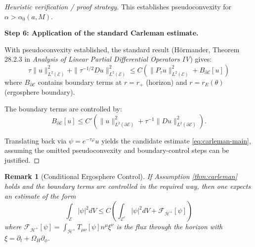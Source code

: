 \documentclass[12pt,a4paper]{article}
\newtheorem{remark}[theorem]{Remark}
\begin{document}
\begin{proof}[Heuristic verification / proof strategy]
This establishes pseudoconvexity for $\alpha > \alpha_0(a, M)$.

\textbf{Step 6: Application of the standard Carleman estimate.}

With pseudoconvexity established, the standard result (Hörmander, Theorem 28.2.3 in \textit{Analysis of Linear Partial Differential Operators IV}) gives:
\begin{equation}
\tau\|u\|_{L^2(\mathcal{E})}^2 + \|\tau^{-1/2}Du\|_{L^2(\mathcal{E})}^2 \leq C\left(\|P_\tau u\|_{L^2(\mathcal{E})}^2 + B_{\partial\mathcal{E}}[u]\right)
\end{equation}
where $B_{\partial\mathcal{E}}$ contains boundary terms at $r = r_+$ (horizon) and $r = r_E(\theta)$ (ergosphere boundary).

The boundary terms are controlled by:
\begin{equation}
B_{\partial\mathcal{E}}[u] \leq C'\left(\|u\|_{L^2(\partial\mathcal{E})}^2 + \tau^{-1}\|Du\|_{L^2(\partial\mathcal{E})}^2\right).
\end{equation}

Translating back via $\psi = e^{-\tau\varphi}u$ yields the candidate estimate \eqref{eq:carleman-main}, assuming the omitted pseudoconvexity and boundary-control steps can be justified.
\end{proof}

\begin{remark}[Conditional Ergosphere Control]\label{cor:ergo-control}
If Assumption \ref{thm:carleman} holds and the boundary terms are controlled in the required way, then one expects an estimate of the form
\begin{equation}
\int_{\mathcal{E}}|\psi|^2 dV \leq C\left(\int_{\mathcal{E}^c}|\psi|^2 dV + \mathcal{F}_{\mathcal{H}^+}[\psi]\right)
\end{equation}
where $\mathcal{F}_{\mathcal{H}^+}[\psi] = \int_{\mathcal{H}^+}T_{\mu\nu}[\psi]n^\mu \xi^\nu$ is the flux through the horizon with $\xi = \partial_t + \Omega_H\partial_\phi$.
\end{remark}
\end{document}
